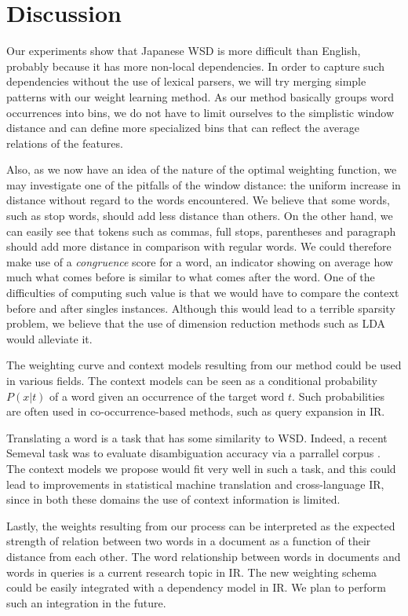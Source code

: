 \documentclass[english]{jnlp_1.4}
\begin{document}
\section{Discussion}
\label{sec:Future-research}

Our experiments show that Japanese WSD is more difficult than English,
probably because it has more non-local dependencies. In order to capture
such dependencies without the use of lexical parsers, we will try
merging simple patterns with our weight learning method. As our method
basically groups word occurrences into bins, we do not have to limit
ourselves to the simplistic window distance and can define more specialized
bins that can reflect the average relations of the features. 

Also, as we now have an idea of the nature of the optimal weighting
function, we may investigate one of the pitfalls of the window distance:
the uniform increase in distance without regard to the words encountered.
We believe that some words, such as stop words, should add less distance
than others. On the other hand, we can easily see that tokens such
as commas, full stops, parentheses and paragraph should add more distance
in comparison with regular words. We could therefore make use of a
\emph{congruence} score for a word, an indicator showing on average
how much what comes before is similar to what comes after the word.
One of the difficulties of computing such value is that we would have
to compare the context before and after singles instances. Although
this would lead to a terrible sparsity problem, we believe that the
use of dimension reduction methods such as LDA would alleviate it. 

The weighting curve and context models resulting from our method could
be used in various fields. The context models can be seen as a conditional
probability $P(x|t)$ of a word given an occurrence of the target
word $t$. Such probabilities are often used in co-occurrence-based
methods, such as query expansion in IR.

Translating a word is a task that has some similarity to WSD. Indeed,
a recent Semeval task was to evaluate disambiguation accuracy via
a parrallel corpus \cite{Semeval2010CrossLingualWSD}. The context
models we propose would fit very well in such a task, and this could
lead to improvements in statistical machine translation and cross-language
IR, since in both these domains the use of context information is
limited.

Lastly, the weights resulting from our process can be interpreted
as the expected strength of relation between two words in a document
as a function of their distance from each other. The word relationship
between words in documents and words in queries is a current research
topic in IR. The new weighting schema could be easily integrated with
a dependency model in IR. We plan to perform such an integration in
the future. 
\end{document}
